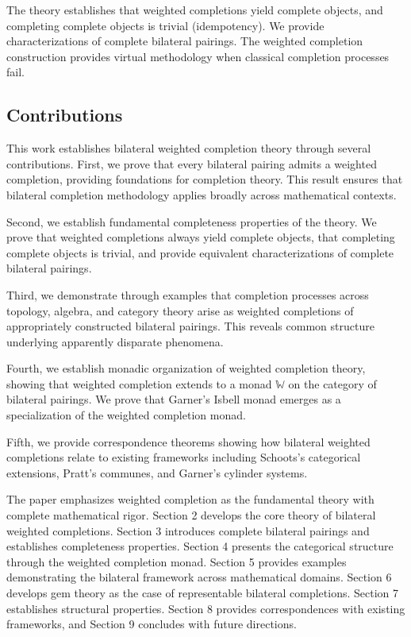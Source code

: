 \documentclass[11pt]{article}
\theoremstyle{plain}
\theoremstyle{definition}
\theoremstyle{remark}
\begin{document}
The theory establishes that weighted completions yield complete objects, and completing complete objects is trivial (idempotency). We provide characterizations of complete bilateral pairings. The weighted completion construction provides virtual methodology when classical completion processes fail.

\subsection{Contributions}

This work establishes bilateral weighted completion theory through several contributions. First, we prove that every bilateral pairing admits a weighted completion, providing foundations for completion theory. This result ensures that bilateral completion methodology applies broadly across mathematical contexts.

Second, we establish fundamental completeness properties of the theory. We prove that weighted completions always yield complete objects, that completing complete objects is trivial, and provide equivalent characterizations of complete bilateral pairings.

Third, we demonstrate through examples that completion processes across topology, algebra, and category theory arise as weighted completions of appropriately constructed bilateral pairings. This reveals common structure underlying apparently disparate phenomena.

Fourth, we establish monadic organization of weighted completion theory, showing that weighted completion extends to a monad $\mathbb{W}$ on the category of bilateral pairings. We prove that Garner's Isbell monad emerges as a specialization of the weighted completion monad.

Fifth, we provide correspondence theorems showing how bilateral weighted completions relate to existing frameworks including Schoots's categorical extensions, Pratt's communes, and Garner's cylinder systems.

The paper emphasizes weighted completion as the fundamental theory with complete mathematical rigor. Section 2 develops the core theory of bilateral weighted completions. Section 3 introduces complete bilateral pairings and establishes completeness properties. Section 4 presents the categorical structure through the weighted completion monad. Section 5 provides examples demonstrating the bilateral framework across mathematical domains. Section 6 develops gem theory as the case of representable bilateral completions. Section 7 establishes structural properties. Section 8 provides correspondences with existing frameworks, and Section 9 concludes with future directions.
\end{document}
